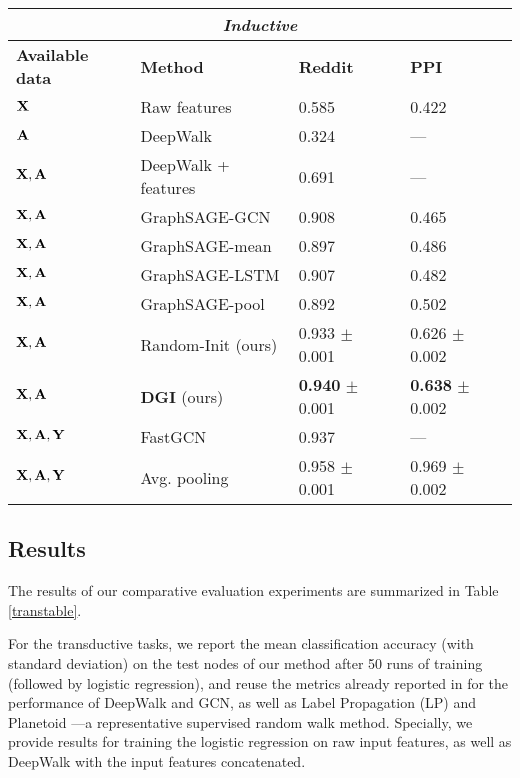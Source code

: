 \documentclass{article} \usepackage{iclr2019_conference,times}
\begin{document}
\begin{table}[ht]
\begin{center}
\begin{tabular}{l l l l l}
\bottomrule \end{tabular}
\begin{tabular}{l l l l}
\\
\multicolumn{4}{c}{\textbf{\emph{Inductive}}}\\
\toprule 
{\bf Available data} & {\bf Method} & {\bf Reddit} & {\bf PPI}\\ \midrule
${\bf X}$ & Raw features & 0.585 & 0.422 \\
${\bf A}$ & DeepWalk \citep{perozzi2014deepwalk} & 0.324 & --- \\
${\bf X}, {\bf A}$ & DeepWalk + features & 0.691 & --- \\ \midrule
${\bf X}, {\bf A}$ & GraphSAGE-GCN \citep{hamilton2017inductive} & 0.908 & 0.465 \\
${\bf X}, {\bf A}$ & GraphSAGE-mean \citep{hamilton2017inductive} & 0.897 & 0.486 \\
${\bf X}, {\bf A}$ & GraphSAGE-LSTM \citep{hamilton2017inductive} & 0.907 & 0.482 \\
${\bf X}, {\bf A}$ & GraphSAGE-pool \citep{hamilton2017inductive} & 0.892 & 0.502 \\\midrule
${\bf X}, {\bf A}$ & Random-Init (ours) & 0.933 $\pm$ 0.001 & {0.626} $\pm$ 0.002 \\
${\bf X}, {\bf A}$ & {\bf DGI} (ours) & {\bf 0.940} $\pm$ 0.001 & {\bf 0.638} $\pm$ 0.002  \\\midrule
${\bf X}, {\bf A}, {\bf Y}$ & FastGCN \citep{chen2018fastgcn} & 0.937 & ---\\
${\bf X}, {\bf A}, {\bf Y}$ & Avg. pooling \citep{zhang2018gaan} & 0.958 $\pm$ 0.001 & 0.969 $\pm$ 0.002\\
\bottomrule
\end{tabular}
\end{center}
\end{table}

\subsection{Results}
The results of our comparative evaluation experiments are summarized in Table \ref{transtable}. 

For the transductive tasks, we report the mean classification accuracy (with standard deviation) on the test nodes of our method after 50 runs of training (followed by logistic regression), and reuse the metrics already reported in \cite{kipf2016semi} for the performance of DeepWalk and GCN, as well as Label Propagation (LP) \citep{zhu2003semi} and Planetoid \citep{yang2016revisiting}---a representative supervised random walk method. Specially, we provide results for training the logistic regression on raw input features, as well as DeepWalk with the input features concatenated. 
\end{document}
